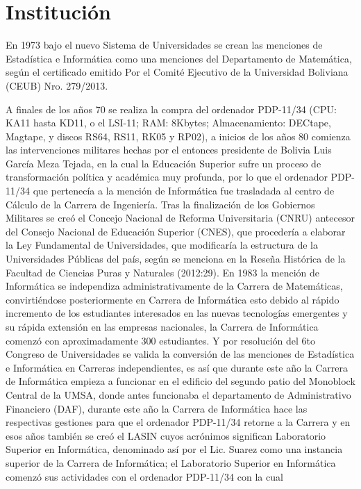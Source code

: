 \section{Institución}
En 1973 bajo el nuevo Sistema de Universidades se crean las menciones de Estadística
e Informática como una menciones del Departamento de Matemática, según el certificado
emitido Por el Comité Ejecutivo de la Universidad Boliviana (CEUB) Nro. 279/2013.

A finales de los años 70 se realiza la compra del ordenador PDP-11/34
(CPU: KA11 hasta KD11, o el LSI-11; RAM: 8Kbytes; Almacenamiento: DECtape,
Magtape, y discos RS64, RS11, RK05 y RP02), a inicios de los años 80 comienza
las intervenciones militares hechas por el entonces presidente de Bolivia Luis
García Meza Tejada, en la cual la Educación Superior sufre un proceso de
transformación política y académica muy profunda, por lo que el ordenador
PDP-11/34 que pertenecía a la mención de Informática fue trasladada al
centro de Cálculo de la Carrera de Ingeniería. Tras la finalización de
los Gobiernos Militares se creó el Concejo Nacional de Reforma Universitaria
(CNRU) antecesor del Consejo Nacional de Educación Superior (CNES), que procedería
a elaborar la Ley Fundamental de Universidades, que modificaría la estructura de
la Universidades Públicas del país, según se menciona en la Reseña Histórica de
la Facultad de Ciencias Puras y Naturales (2012:29). En 1983 la mención de
Informática se independiza administrativamente de la Carrera de Matemáticas,
convirtiéndose posteriormente en Carrera de Informática esto debido al rápido
incremento de los estudiantes interesados en las nuevas tecnologías emergentes
y su rápida extensión en las empresas nacionales, la Carrera de Informática comenzó
con aproximadamente 300 estudiantes. Y por resolución del 6to Congreso de
Universidades se valida la conversión de las menciones de Estadística e
Informática en Carreras independientes, es así que durante este año la
Carrera de Informática empieza a funcionar en el edificio del segundo
patio del Monoblock Central de la UMSA, donde antes funcionaba el departamento
de Administrativo Financiero (DAF), durante este año la Carrera de Informática
hace las respectivas gestiones para que el ordenador PDP-11/34 retorne a la
Carrera y en esos años también se creó el LASIN cuyos acrónimos significan
Laboratorio Superior en Informática, denominado así por el Lic. Suarez como
una instancia superior de la Carrera de Informática; el Laboratorio Superior
en Informática comenzó sus actividades con el ordenador PDP-11/34 con la cual
